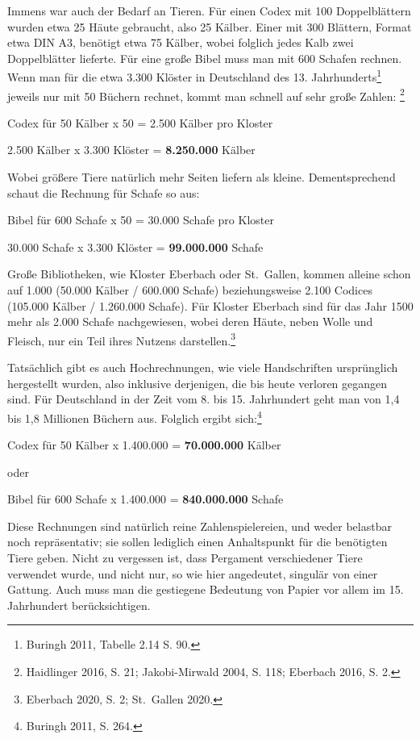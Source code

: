 \documentclass[a4paper,
fontsize=11pt,
oneside,
numbers=noperiodatend,
parskip=half-,
bibliography=totoc,
final
]{scrartcl}
\begin{document}
Immens war auch der Bedarf an Tieren. Für einen Codex mit 100
Doppelblättern wurden etwa 25 Häute gebraucht, also 25 Kälber. Einer mit
300 Blättern, Format etwa DIN A3, benötigt etwa 75 Kälber, wobei
folglich jedes Kalb zwei Doppelblätter lieferte. Für eine große Bibel
muss man mit 600 Schafen rechnen. Wenn man für die etwa 3.300 Klöster in
Deutschland des 13. Jahrhunderts\footnote{Buringh 2011, Tabelle 2.14 S.
  90.} jeweils nur mit 50 Büchern rechnet, kommt man schnell auf sehr
große Zahlen: \footnote{Haidlinger 2016, S. 21; Jakobi-Mirwald 2004, S.
  118; Eberbach 2016, S. 2.}

Codex für 50 Kälber x 50 = 2.500 Kälber pro Kloster

2.500 Kälber x 3.300 Klöster = \textbf{8.250.000} Kälber

Wobei größere Tiere natürlich mehr Seiten liefern als kleine.
Dementsprechend schaut die Rechnung für Schafe so aus:

Bibel für 600 Schafe x 50 = 30.000 Schafe pro Kloster

30.000 Schafe x 3.300 Klöster = \textbf{99.000.000} Schafe

Große Bibliotheken, wie Kloster Eberbach oder St.~Gallen, kommen alleine
schon auf 1.000 (50.000 Kälber / 600.000 Schafe) beziehungsweise 2.100
Codices (105.000 Kälber / 1.260.000 Schafe). Für Kloster Eberbach sind
für das Jahr 1500 mehr als 2.000 Schafe nachgewiesen, wobei deren Häute,
neben Wolle und Fleisch, nur ein Teil ihres Nutzens
darstellen.\footnote{Eberbach 2020, S. 2; St.~Gallen 2020.}

Tatsächlich gibt es auch Hochrechnungen, wie viele Handschriften
ursprünglich hergestellt wurden, also inklusive derjenigen, die bis
heute verloren gegangen sind. Für Deutschland in der Zeit vom 8. bis 15.
Jahrhundert geht man von 1,4 bis 1,8 Millionen Büchern aus. Folglich
ergibt sich:\footnote{Buringh 2011, S. 264.}

Codex für 50 Kälber x 1.400.000 = \textbf{70.000.000} Kälber

oder

Bibel für 600 Schafe x 1.400.000 = \textbf{840.000.000} Schafe

Diese Rechnungen sind natürlich reine Zahlenspielereien, und weder
belastbar noch repräsentativ; sie sollen lediglich einen Anhaltspunkt
für die benötigten Tiere geben. Nicht zu vergessen ist, dass Pergament
verschiedener Tiere verwendet wurde, und nicht nur, so wie hier
angedeutet, singulär von einer Gattung. Auch muss man die gestiegene
Bedeutung von Papier vor allem im 15. Jahrhundert berücksichtigen.
\end{document}
